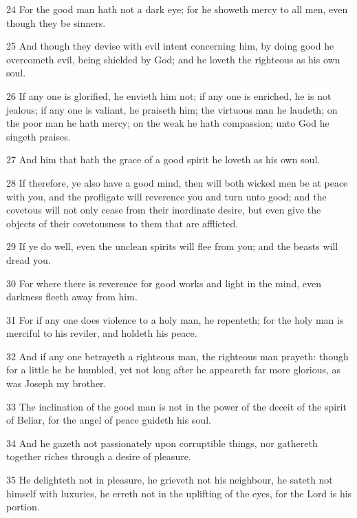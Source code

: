 \par 24 For the good man hath not a dark eye; for he showeth mercy to all men, even though they be sinners.

\par 25 And though they devise with evil intent concerning him, by doing good he overcometh evil, being shielded by God; and he loveth the righteous as his own soul.

\par 26 If any one is glorified, he envieth him not; if any one is enriched, he is not jealous; if any one is valiant, he praiseth him; the virtuous man he laudeth; on the poor man he hath mercy; on the weak he hath compassion; unto God he singeth praises.

\par 27 And him that hath the grace of a good spirit he loveth as his own soul.

\par 28 If therefore, ye also have a good mind, then will both wicked men be at peace with you, and the profligate will reverence you and turn unto good; and the covetous will not only cease from their inordinate desire, but even give the objects of their covetousness to them that are afflicted.

\par 29 If ye do well, even the unclean spirits will flee from you; and the beasts will dread you.

\par 30 For where there is reverence for good works and light in the mind, even darkness fleeth away from him.

\par 31 For if any one does violence to a holy man, he repenteth; for the holy man is merciful to his reviler, and holdeth his peace.

\par 32 And if any one betrayeth a righteous man, the righteous man prayeth: though for a little he be humbled, yet not long after he appeareth far more glorious, as was Joseph my brother.

\par 33 The inclination of the good man is not in the power of the deceit of the spirit of Beliar, for the angel of peace guideth his soul.

\par 34 And he gazeth not passionately upon corruptible things, nor gathereth together riches through a desire of pleasure.

\par 35 He delighteth not in pleasure, he grieveth not his neighbour, he sateth not himself with luxuries, he erreth not in the uplifting of the eyes, for the Lord is his portion.

